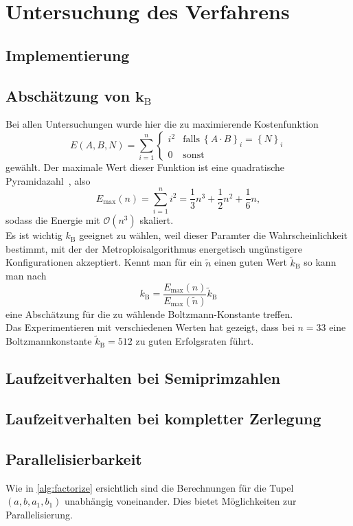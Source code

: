 \chapter{Untersuchung des Verfahrens}

\section{Implementierung}

\section{\texorpdfstring{Abschätzung von $\bm{k_\mathrm{B}}$}{Abschätzung von kB}}
Bei allen Untersuchungen wurde hier die zu maximierende Kostenfunktion
\begin{equation*}
		E\left(A,B,N\right)=\sum\limits_{i=1}^n\begin{cases}
    i^2 & \mathrm{falls}\:{\left\{A\cdot B\right\}}_i={\left\{N\right\}}_i \\
	0 & \mathrm{sonst}
  \end{cases}
\end{equation*}
gewählt. Der maximale Wert dieser Funktion ist eine quadratische Pyramidazahl~\parencite{oeis}, also
\begin{equation*}
		E_{\mathrm{max}}\left(n\right)=\sum\limits_{i=1}^n i^2=\frac{1}{3}n^3+\frac{1}{2}n^2+\frac{1}{6}n,
\end{equation*}
sodass die Energie mit $\mathcal{O}\left(n^3\right)$ skaliert. \\
Es ist wichtig $k_\mathrm{B}$ geeignet zu wählen, weil dieser Paramter die Wahrscheinlichkeit bestimmt, mit der der Metroploisalgorithmus energetisch ungünstigere Konfigurationen akzeptiert. Kennt man für ein $\tilde{n}$ einen guten Wert $\tilde{k}_\mathrm{B}$ so kann man nach
\begin{equation*}
		k_\mathrm{B}=\frac{E_{\mathrm{max}}\left(n\right)}{E_{\mathrm{max}}\left(\tilde{n}\right)}\tilde{k}_\mathrm{B}
\end{equation*}
eine Abschätzung für die zu wählende Boltzmann-Konstante treffen. \\
Das Experimentieren mit verschiedenen Werten hat gezeigt, dass bei $n=33$ eine Boltzmannkonstante $\tilde{k}_\mathrm{B}=512$ zu guten Erfolgsraten führt.

\section{Laufzeitverhalten bei Semiprimzahlen}

\section{Laufzeitverhalten bei kompletter Zerlegung}

\section{Parallelisierbarkeit}
Wie in \ref{alg:factorize} ersichtlich sind die Berechnungen für die Tupel $\left(a, b, a_1, b_1\right)$ unabhängig voneinander. Dies bietet Möglichkeiten zur Parallelisierung.
